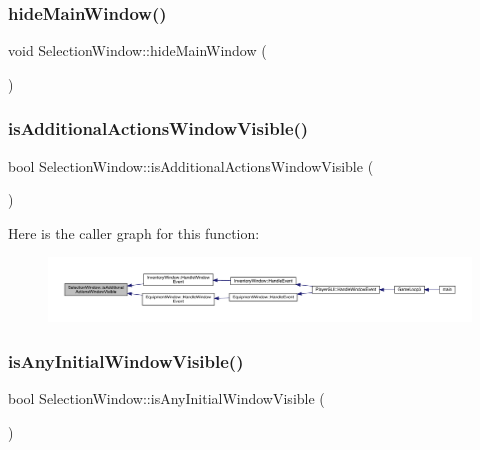 \subsubsection{\texorpdfstring{hide\+Main\+Window()}{hideMainWindow()}}
{\footnotesize\ttfamily void Selection\+Window\+::hide\+Main\+Window (\begin{DoxyParamCaption}{ }\end{DoxyParamCaption})}

\mbox{\label{class_selection_window_a3602db55b8338439a3df5db287b1f54f}} 
\subsubsection{\texorpdfstring{is\+Additional\+Actions\+Window\+Visible()}{isAdditionalActionsWindowVisible()}}
{\footnotesize\ttfamily bool Selection\+Window\+::is\+Additional\+Actions\+Window\+Visible (\begin{DoxyParamCaption}{ }\end{DoxyParamCaption})}

Here is the caller graph for this function\+:
\nopagebreak
\begin{figure}[H]
\begin{center}
\leavevmode
\includegraphics[width=350pt]{db/d9c/class_selection_window_a3602db55b8338439a3df5db287b1f54f_icgraph}
\end{center}
\end{figure}
\mbox{\label{class_selection_window_a40ffbdbd4b8bc3ef84208faed2ae97da}} 
\subsubsection{\texorpdfstring{is\+Any\+Initial\+Window\+Visible()}{isAnyInitialWindowVisible()}}
{\footnotesize\ttfamily bool Selection\+Window\+::is\+Any\+Initial\+Window\+Visible (\begin{DoxyParamCaption}{ }\end{DoxyParamCaption})}

